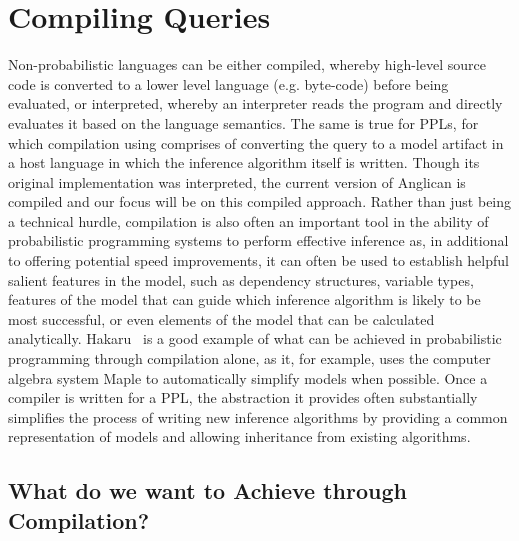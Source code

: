 
\section{Compiling Queries}
\label{sec:proginf:comp}

Non-probabilistic languages can be either compiled, whereby high-level source code
is converted to a lower level language (e.g. byte-code) before being evaluated, or interpreted,
whereby an interpreter reads the program and directly evaluates it based on the language
semantics.
The same is true for PPLs, for which compilation using comprises of converting the
query to a model artifact in a host language in which the inference algorithm itself is
written.  Though its original implementation was interpreted, the current version of
Anglican is compiled and our focus will be on this compiled approach.
Rather than just being a technical hurdle, compilation is also 
often an important tool in the ability of probabilistic programming systems to perform
effective inference as, in additional to offering potential speed improvements,
it can often be used to establish helpful salient features in the model,
such as dependency structures, variable types, features of the model that can guide
which inference algorithm is likely to be most successful, or even elements of the model
that can be calculated analytically.  Hakaru~\citep{narayanan2016probabilistic,zinkov2016composing} is a good
example of what can be achieved in probabilistic programming through compilation alone,
as it, for example, uses the computer algebra system Maple to automatically simplify models
when possible.  Once a compiler is written for a PPL, the abstraction it provides often substantially simplifies
the process of writing new inference algorithms by providing a common representation of
models and allowing inheritance from existing algorithms.

\subsection{What do we want to Achieve through Compilation?}
\label{sec:proginf:comp:want}

